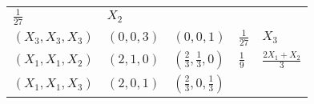 \documentclass[]{book}
\theoremstyle{break}
\theoremstyle{definition}
\theoremstyle{definition}
\theoremstyle{definition}
\theoremstyle{remark}
\begin{document}
\begin{longtable}[]{@{}lllll@{}}
\begin{minipage}[t]{0.17\columnwidth}
\(\frac{1}{27}\)\strut
\end{minipage} & \begin{minipage}[t]{0.18\columnwidth}\raggedright\strut
\(X_2\)\strut
\end{minipage}\tabularnewline
\begin{minipage}[t]{0.18\columnwidth}\raggedright\strut
\(\left( X_3,X_3,X_3 \right)\)\strut
\end{minipage} & \begin{minipage}[t]{0.16\columnwidth}\raggedright\strut
\(\left( 0,0,3 \right)\)\strut
\end{minipage} & \begin{minipage}[t]{0.16\columnwidth}\raggedright\strut
\(\left(0,0,1 \right)\)\strut
\end{minipage} & \begin{minipage}[t]{0.17\columnwidth}\raggedright\strut
\(\frac{1}{27}\)\strut
\end{minipage} & \begin{minipage}[t]{0.18\columnwidth}\raggedright\strut
\(X_3\)\strut
\end{minipage}\tabularnewline
\begin{minipage}[t]{0.18\columnwidth}\raggedright\strut
\(\left( X_1,X_1,X_2 \right)\)\strut
\end{minipage} & \begin{minipage}[t]{0.16\columnwidth}\raggedright\strut
\(\left( 2,1,0 \right)\)\strut
\end{minipage} & \begin{minipage}[t]{0.16\columnwidth}\raggedright\strut
\(\left( \frac{2}{3},\frac{1}{3},0 \right)\)\strut
\end{minipage} & \begin{minipage}[t]{0.17\columnwidth}\raggedright\strut
\(\frac{1}{9}\)\strut
\end{minipage} & \begin{minipage}[t]{0.18\columnwidth}\raggedright\strut
\(\frac{2X_1+X_2}{3}\)\strut
\end{minipage}\tabularnewline
\begin{minipage}[t]{0.18\columnwidth}\raggedright\strut
\(\left( X_1,X_1,X_3 \right)\)\strut
\end{minipage} & \begin{minipage}[t]{0.16\columnwidth}\raggedright\strut
\(\left( 2,0,1 \right)\)\strut
\end{minipage} & \begin{minipage}[t]{0.16\columnwidth}\raggedright\strut
\(\left( \frac{2}{3},0,\frac{1}{3} \right)\)\strut

\end{minipage}
\end{longtable}
\end{document}
